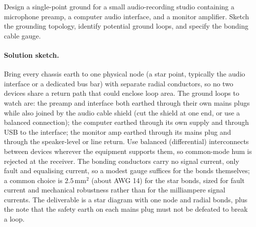 \begin{exercise}
Design a single-point ground for a small audio-recording studio
containing a microphone preamp, a computer audio interface, and a
monitor amplifier. Sketch the grounding topology, identify potential
ground loops, and specify the bonding cable gauge.

\paragraph{Solution sketch.} Bring every chassis earth to one physical node
(a star point, typically the audio interface or a dedicated bus bar)
with separate radial conductors, so no two devices share a return path
that could enclose loop area. The ground loops to watch are: the preamp
and interface both earthed through their own mains plugs while also
joined by the audio cable shield (cut the shield at one end, or use a
balanced connection); the computer earthed through its own supply and
through USB to the interface; the monitor amp earthed through its mains
plug and through the speaker-level or line return. Use balanced
(differential) interconnects between devices wherever the equipment
supports them, so common-mode hum is rejected at the receiver. The
bonding conductors carry no signal current, only fault and equalising
current, so a modest gauge suffices for the bonds themselves; a common
choice is $2.5\,\si{\milli\meter\squared}$ (about AWG 14) for the star
bonds, sized for fault current and mechanical robustness rather than
for the milliampere signal currents. The deliverable is a star diagram
with one node and radial bonds, plus the note that the safety earth on
each mains plug must not be defeated to break a loop.
\end{exercise}

